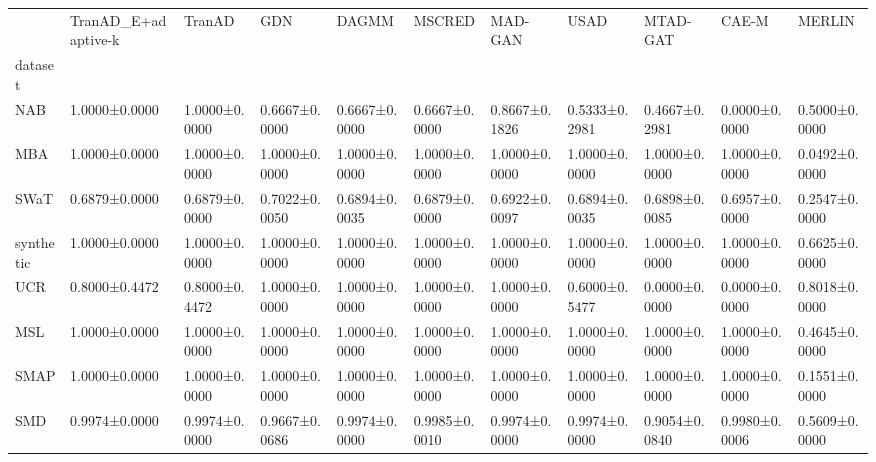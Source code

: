 \begin{tabular}{lllllllllll}
\toprule
 & TranAD_E+adaptive-k & TranAD & GDN & DAGMM & MSCRED & MAD-GAN & USAD & MTAD-GAT & CAE-M & MERLIN \\
dataset &  &  &  &  &  &  &  &  &  &  \\
\midrule
NAB & 1.0000±0.0000 & 1.0000±0.0000 & 0.6667±0.0000 & 0.6667±0.0000 & 0.6667±0.0000 & 0.8667±0.1826 & 0.5333±0.2981 & 0.4667±0.2981 & 0.0000±0.0000 & 0.5000±0.0000 \\
MBA & 1.0000±0.0000 & 1.0000±0.0000 & 1.0000±0.0000 & 1.0000±0.0000 & 1.0000±0.0000 & 1.0000±0.0000 & 1.0000±0.0000 & 1.0000±0.0000 & 1.0000±0.0000 & 0.0492±0.0000 \\
SWaT & 0.6879±0.0000 & 0.6879±0.0000 & 0.7022±0.0050 & 0.6894±0.0035 & 0.6879±0.0000 & 0.6922±0.0097 & 0.6894±0.0035 & 0.6898±0.0085 & 0.6957±0.0000 & 0.2547±0.0000 \\
synthetic & 1.0000±0.0000 & 1.0000±0.0000 & 1.0000±0.0000 & 1.0000±0.0000 & 1.0000±0.0000 & 1.0000±0.0000 & 1.0000±0.0000 & 1.0000±0.0000 & 1.0000±0.0000 & 0.6625±0.0000 \\
UCR & 0.8000±0.4472 & 0.8000±0.4472 & 1.0000±0.0000 & 1.0000±0.0000 & 1.0000±0.0000 & 1.0000±0.0000 & 0.6000±0.5477 & 0.0000±0.0000 & 0.0000±0.0000 & 0.8018±0.0000 \\
MSL & 1.0000±0.0000 & 1.0000±0.0000 & 1.0000±0.0000 & 1.0000±0.0000 & 1.0000±0.0000 & 1.0000±0.0000 & 1.0000±0.0000 & 1.0000±0.0000 & 1.0000±0.0000 & 0.4645±0.0000 \\
SMAP & 1.0000±0.0000 & 1.0000±0.0000 & 1.0000±0.0000 & 1.0000±0.0000 & 1.0000±0.0000 & 1.0000±0.0000 & 1.0000±0.0000 & 1.0000±0.0000 & 1.0000±0.0000 & 0.1551±0.0000 \\
SMD & 0.9974±0.0000 & 0.9974±0.0000 & 0.9667±0.0686 & 0.9974±0.0000 & 0.9985±0.0010 & 0.9974±0.0000 & 0.9974±0.0000 & 0.9054±0.0840 & 0.9980±0.0006 & 0.5609±0.0000 \\
\bottomrule
\end{tabular}


